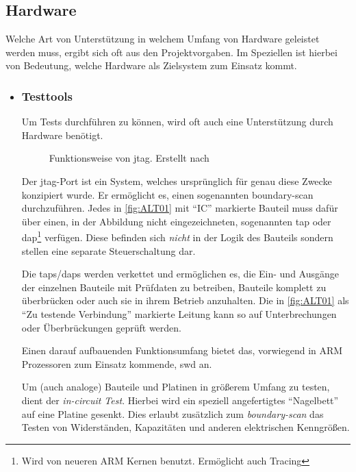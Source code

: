 \subsection{Hardware}\label{sub:hardware}
Welche Art von Unterstützung in welchem Umfang von Hardware geleistet werden
muss, ergibt sich oft aus den Projektvorgaben. Im Speziellen ist hierbei von
Bedeutung, welche Hardware als Zielsystem zum Einsatz kommt.
\begin{itemize}
  \item \subsubsection*{Testtools} Um Tests durchführen zu können, wird
  oft auch eine Unterstützung durch Hardware benötigt. 
  \begin{figure}[!h]
    \centering
    \def\svgwidth{\columnwidth}
    
    \caption{Funktionsweise von \gls{jtag}. Erstellt nach \cite{ALT01}}
    \label{fig:ALT01}
  \end{figure}
  Der \gls{jtag}-Port ist ein System, welches ursprünglich für genau diese
  Zwecke konzipiert wurde. Er ermöglicht es, einen sogenannten boundary-scan
  durchzuführen. Jedes in \autoref{fig:ALT01} mit "`IC"' markierte Bauteil muss
  dafür über einen, in der Abbildung nicht eingezeichneten, sogenannten \gls{tap} oder
  \gls{dap}\footnote{Wird von neueren ARM Kernen benutzt.
  Ermöglicht auch Tracing} verfügen. Diese befinden sich \emph{nicht} in der
  Logik des Bauteils sondern stellen eine separate Steuerschaltung dar.
  
  Die \glspl{tap}/\glspl{dap} werden verkettet und ermöglichen es, die Ein-
  und Ausgänge der einzelnen Bauteile mit Prüfdaten zu betreiben, Bauteile komplett
  zu überbrücken oder auch sie in ihrem Betrieb anzuhalten.
  Die in \autoref{fig:ALT01} als "`Zu testende Verbindung"' markierte Leitung
  kann so auf Unterbrechungen oder Überbrückungen geprüft werden.
  
  Einen darauf aufbauenden Funktionsumfang bietet das, vorwiegend in ARM
  Prozessoren zum Einsatz kommende, \gls{swd} an.
  
  Um (auch analoge) Bauteile und Platinen in größerem Umfang zu testen, dient
  der \emph{in-circuit Test}. Hierbei wird ein speziell angefertigtes
  "`Nagelbett"' auf eine Platine gesenkt. Dies erlaubt zusätzlich zum
  \emph{boundary-scan} das Testen von Widerständen, Kapazitäten und anderen
  elektrischen Kenngrößen.
   

\end{itemize}

